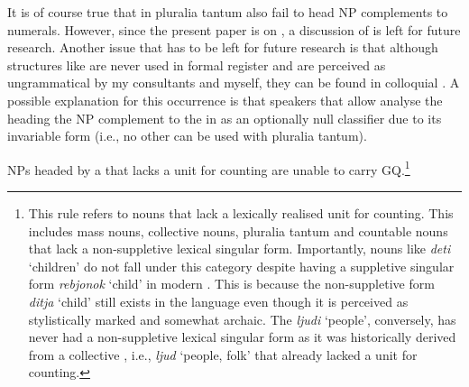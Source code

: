 \documentclass[output=paper,modfonts,newtxmath,hidelinks]{langscibook}
\begin{document}
{\begin{multicols}{2}
\end{multicols}

\noindent It is of course true that in  pluralia tantum also fail to head NP complements to numerals. However, since the present paper is on , a discussion of  is left for future research. Another issue that has to be left for future research is that although structures like  are never used in formal register and are perceived as ungrammatical by my consultants and myself, they can be found in colloquial . A possible explanation for this occurrence is that speakers that allow  analyse the  heading the NP complement to the  in  as an optionally null classifier due to its invariable form (i.e., no other  can be used with pluralia tantum).}
\newpage 

\ea \label{18:ex8} NPs headed by a  that lacks a unit for counting are unable to carry GQ.\label{18:ex:key:8}\footnote{\label{18:fn5}This rule refers to nouns that lack a lexically realised unit for counting. This includes mass nouns, collective nouns, pluralia tantum and countable nouns that lack a non-suppletive lexical singular form. Importantly, nouns like \textit{deti} ‘children’ do not fall under this category despite having a suppletive singular form \textit{rebjonok} ‘child’ in modern . This is because the non-suppletive form \textit{ditja} ‘child’ still exists in the language even though it is perceived as stylistically marked and somewhat archaic.  The  \textit{ljudi} ‘people’, conversely, has never had a non-suppletive lexical singular form as it was historically derived from a collective , i.e., \textit{ljud} ‘people, folk’ \citep{Chumakina-etal2004} that already lacked a unit for counting.
}

    \z
\end{document}
